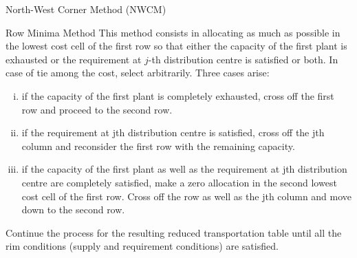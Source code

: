 \documentclass[../main.tex]{subfiles}
\begin{document}
\begin{frame}{North-West Corner Method (NWCM)}


  
\end{frame}

\begin{frame}{Row Minima Method}
  This method consists in allocating as much as possible in the lowest cost cell of the first row so that either the capacity of the first plant is exhausted or the requirement at $j$-th distribution centre is satisfied or both. In case of tie among the cost, select arbitrarily. Three cases arise:
  \begin{enumerate}[(i)]\justifying
\item if the capacity of the first plant is completely exhausted, cross off the first row and proceed to the second row.
\item if the requirement at jth distribution centre is satisfied, cross off the jth column and reconsider the first row with the remaining capacity.
\item if the capacity of the first plant as well as the requirement at jth distribution centre are completely satisfied, make a zero allocation in the second lowest cost cell of the first row. Cross off the row as well as the jth column and move down to the second row.
  \end{enumerate}

  Continue the process for the resulting reduced transportation table until all the rim conditions (supply and requirement conditions) are satisfied.
\end{frame}
\end{document}
